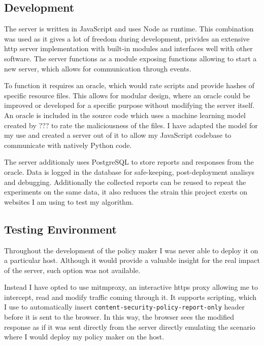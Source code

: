 \subsection{Development}

The server is written in JavaScript and uses Node as runtime.
This combination was used as it gives a lot of freedom during development, privides an extensive http server implementation with built-in modules and interfaces well with other software.
The server functions as a module exposing functions allowing to start a new server, which allows for communication through events.

To function it requires an oracle, which would rate scripts and provide hashes of specific resource files.
This allows for modular design, where an oracle could be improved or developed for a specific purpose without modifying the server itself.
An oracle is included in the source code which uses a machine learning model created by ??? to rate the maliciousness of the files.
I have adapted the model for my use and created a server out of it to allow my JavaScript codebase to communicate with natively Python code.

The server additionaly uses PostgreSQL to store reports and responses from the oracle.
Data is logged in the database for safe-keeping, post-deployment analisys and debugging.
Additionally the collected reports can be reused to repeat the experiments on the same data, it also reduces the strain this project exerts on websites I am using to test my algorithm.


\subsection{Testing Environment}

Throughout the development of the policy maker I was never able to deploy it on a particular host.
Although it would provide a valuable insight for the real impact of the server, such option was not available.

Instead I have opted to use mitmproxy, an interactive https proxy allowing me to intercept, read and modify traffic coming through it.
It supports scripting, which I use to automatically insert \texttt{content-security-policy-report-only} header before it is sent to the browser.
In this way, the browser sees the modified response as if it was sent directly from the server directly emulating the scenario where I would deploy my policy maker on the host.

